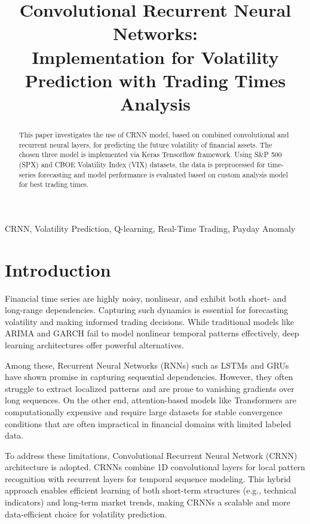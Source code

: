 \documentclass[conference]{IEEEtran}
\title{Convolutional Recurrent Neural Networks: \\
Implementation for Volatility Prediction with  Trading Times Analysis}
\author{
    \IEEEauthorblockN{Denys Shkola\IEEEauthorrefmark{1}, Markus Gruber\IEEEauthorrefmark{2}, Orest Mykhailiuk\IEEEauthorrefmark{3}}
}
\begin{document}
\maketitle

\thispagestyle{fancy}
\begin{abstract}
This paper investigates the use of CRNN model, based on combined convolutional and recurrent neural layers, for predicting the future volatility of financial assets. The chosen three model is implemented via Keras Tensorflow framework. Using S\&P 500 (SPX) and CBOE Volatility Index (VIX) datasets, the data is preprocessed for time-series forecasting and model performance is evaluated based on custom analysis model for best trading times. 
\end{abstract}

\begin{IEEEkeywords}
CRNN, Volatility Prediction, Q-learning, Real-Time Trading, Payday Anomaly
\end{IEEEkeywords}

\section{Introduction}
Financial time series are highly noisy, nonlinear, and exhibit both short- and long-range dependencies. Capturing such dynamics is essential for forecasting volatility and making informed trading decisions. While traditional models like ARIMA and GARCH fail to model nonlinear temporal patterns effectively, deep learning architectures offer powerful alternatives.

Among these, Recurrent Neural Networks (RNNs) such as LSTMs and GRUs have shown promise in capturing sequential dependencies. However, they often struggle to extract localized patterns and are prone to vanishing gradients over long sequences. On the other end, attention-based models like Transformers are computationally expensive and require large datasets for stable convergence conditions that are often impractical in financial domains with limited labeled data.

To address these limitations, Convolutional Recurrent Neural Network (CRNN) architecture is adopted. CRNNs combine 1D convolutional layers for local pattern recognition with recurrent layers for temporal sequence modeling. This hybrid approach enables efficient learning of both short-term structures (e.g., technical indicators) and long-term market trends, making CRNNs a scalable and more data-efficient choice for volatility prediction.
\end{document}
